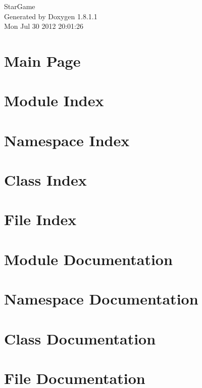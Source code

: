 \documentclass{book}
\begin{document}
\hypersetup{pageanchor=false,citecolor=blue}
\begin{titlepage}
\vspace*{7cm}
\begin{center}
{\Large Star\-Game }\\
\vspace*{1cm}
{\large Generated by Doxygen 1.8.1.1}\\
\vspace*{0.5cm}
{\small Mon Jul 30 2012 20:01:26}\\
\end{center}
\end{titlepage}
\clearemptydoublepage
{}
\tableofcontents
\clearemptydoublepage
{}
\hypersetup{pageanchor=true,citecolor=blue}
\chapter{Main Page}
\label{index}\hypertarget{index}{}
\chapter{Module Index}

\chapter{Namespace Index}

\chapter{Class Index}

\chapter{File Index}

\chapter{Module Documentation}


\chapter{Namespace Documentation}



\chapter{Class Documentation}













\chapter{File Documentation}








\printindex
\end{document}
